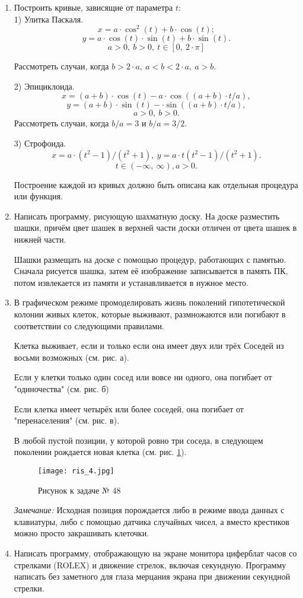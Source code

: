 \begin{enumerate}
\item   Построить кривые, зависящие от параметра $t:$\\

 1) Улитка Паскаля.\\
$$x = a\cdot \cos^2(t) + b\cdot \cos(t);$$
$$ y = a\cdot \cos(t)\cdot\sin(t) + b\cdot\sin(t).$$
$$a > 0, \:b > 0,\: t \in[0,\:2\cdot \pi]$$

Рассмотреть случаи, когда $b > 2\cdot a, \: a < b < 2\cdot a, \: a > b.$

2) Эпициклоида.\\
$$x = (a + b)\cdot\cos(t) - a\cdot\cos((a + b)\cdot t / a),$$
$$y = (a + b)\cdot\sin(t) - \cdot\sin((a + b)\cdot t / a), $$
$$a > 0,\: b > 0.$$
Рассмотреть случаи, когда $b / a = 3$ и $b / a = 3 / 2.$

3) Строфоида.\\
$$x = a\cdot(t^2 -1)/(t^2 + 1), \:y = a\cdot t(t^2-1) / (t^2 +1).$$
$$ t \in (-\infty ,\:\infty),  a > 0.$$

Построение каждой из кривых должно быть описана как отдельная процедура или функция.

\item Написать программу, рисующую шахматную доску. На доске разместить шашки, причём цвет шашек в верхней части доски отличен от цвета шашек в нижней части.

Шашки размещать на доске с помощью процедур, работающих с памятью. Сначала рисуется шашка, затем её изображение записывается в память ПК, потом извлекается из памяти и устанав­ливается в нужное место.

\item В графическом режиме промоделировать жизнь поко­лений гипотетической колонии живых клеток, которые выживают, размножаются или погибают в соответствии со следующими прави­лами.

Клетка выживает, если и только если она имеет двух или трёх Соседей из восьми возможных (см. рис. а).
 
Если у клетки только один сосед или вовсе ни одного, она поги­бает от "одиночества" (см. рис. б)

Если клетка имеет четырёх или более соседей, она погибает от "перенаселения" (см. рис. в).

В любой пустой позиции, у которой ровно три соседа, в следу­ющем поколении рождается новая клетка (см. рис. \ref{ris3}).
\begin{figure}[!hb]
\centerline{
\texttt{[image: ris\_4.jpg]}}
\caption{Рисунок к задаче № 48}
\label{ris3}
\end{figure}

{\it Замечание:} Исходная позиция порождается либо в режиме вво­да данных с клавиатуры, либо с помощью датчика случайных чисел, а вместо крестиков можно просто закрашивать клеточки.

 \item Написать программу, отображающую на экране монитора циферблат часов со стрелками (ROLEX) и движение стрелок, включая секундную. Программу написать без заметного для глаза мерцания экрана при движении секундной стрелки.
 
 \end{enumerate}  

